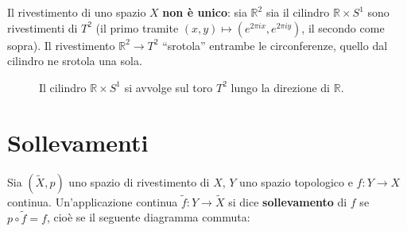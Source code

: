 \begin{observacion}
Il rivestimento di uno spazio $X$ \textbf{non \`e unico}: sia $\mathbb{R}^2$ sia il cilindro $\mathbb{R} \times S^1$ sono rivestimenti di $T^2$ (il primo tramite $(x,y) \mapsto (e^{2\pi i x}, e^{2\pi i y})$, il secondo come sopra). Il rivestimento $\mathbb{R}^2 \to T^2$ ``srotola'' entrambe le circonferenze, quello dal cilindro ne srotola una sola.
\end{observacion}

\begin{figure}[H]
    \centering
    \caption{Il cilindro $\mathbb{R}\times S^1$ si avvolge sul toro $T^2$ lungo la direzione di $\mathbb{R}$.}
\end{figure}

\section{Sollevamenti}

\begin{definicion}[Sollevamento]
Sia $(\widetilde{X}, p)$ uno spazio di rivestimento di $X$, $Y$ uno spazio topologico e $f: Y \to X$ continua. Un'applicazione continua $\widetilde{f}: Y \to \widetilde{X}$ si dice \textbf{sollevamento} di $f$ se $p \circ \widetilde{f} = f$, cio\`e se il seguente diagramma commuta:
\begin{center}
\end{center}
\end{definicion}

